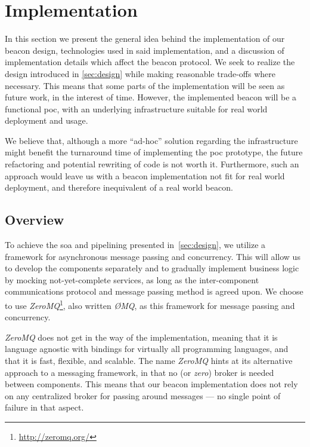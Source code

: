 \section{Implementation}%
\label{sec:implementation}

In this section we present the general idea behind the implementation of our beacon design, technologies used in said implementation, and a discussion of implementation details which affect the beacon protocol.
We seek to realize the design introduced in \cref{sec:design} while making reasonable trade-offs where necessary.
This means that some parts of the implementation will be seen as future work, in the interest of time.
However, the implemented beacon will be a functional \gls{poc}, with an underlying infrastructure suitable for real world deployment and usage.

We believe that, although a more \enquote{ad-hoc} solution regarding the infrastructure might benefit the turnaround time of implementing the \gls{poc} prototype, the future refactoring and potential rewriting of code is not worth it.
Furthermore, such an approach would leave us with a beacon implementation not fit for real world deployment, and therefore inequivalent of a real world beacon.

\subsection{Overview}%
\label{sub:overview}
To achieve the \acrfull{soa} and pipelining presented in~\cref{sec:design}, we utilize a framework for asynchronous message passing and concurrency.
This will allow us to develop the components separately and to gradually implement business logic by mocking not-yet-complete services, as long as the inter-component communications protocol and message passing method is agreed upon.
We choose to use \textit{ZeroMQ}\footnote{\url{http://zeromq.org/}}, also written \textit{ØMQ}, as this framework for message passing and concurrency.

\textit{ZeroMQ} does not get in the way of the implementation, meaning that it is language agnostic with bindings for virtually all programming languages, and that it is fast, flexible, and scalable.
The name \textit{ZeroMQ} hints at its alternative approach to a messaging framework, in that no (or \textit{zero}) broker is needed between components.
This means that our beacon implementation does not rely on any centralized broker for passing around messages --- no single point of failure in that aspect.

